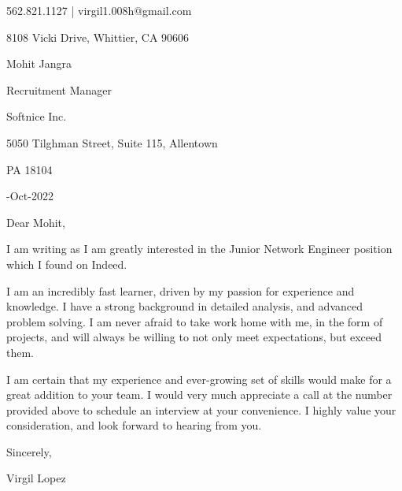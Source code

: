 \documentclass[a4paper]{article}
\makeatletter
\renewcommand{\maketitle}{
    \begin{center}
        \color{white}
        {\huge\bfseries\theauthor}
        \vspace{.5em}

        \textsf{562.821.1127 | virgil1.008h@gmail.com} \par
        \textsf{8108 Vicki Drive, Whittier, CA 90606}

    \end{center}
}
\makeatother
\begin{document}
%

\author{\textsf{Virgil Lopez}}
\maketitle
\vspace{1cm}

Mohit Jangra\par
Recruitment Manager\par
Softnice Inc.\par
5050 Tilghman Street, Suite 115, Allentown\par PA 18104

-Oct-2022

\bigskip
Dear Mohit,

\bigskip
I am writing as I am greatly interested in the Junior Network Engineer position which I found on Indeed.

\bigskip
I am an incredibly fast learner, driven by my passion for experience and knowledge. I have a strong background in detailed analysis, and advanced problem solving. I am never afraid to take work home with me, in the form of projects, and will always be willing to not only meet expectations, but exceed them.

\bigskip
I am certain that my experience and ever-growing set of skills would make for a great addition to your team. I would very much appreciate a call at the number provided above to schedule an interview at your convenience. I highly value your consideration, and look forward to hearing from you.

\bigskip
Sincerely,


\bigskip
Virgil Lopez
\end{document}
